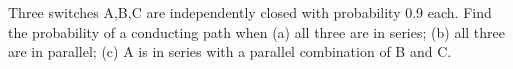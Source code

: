 Three switches A,B,C are independently closed with probability 0.9 each. Find the probability of a conducting path when (a) all three are in series; (b) all three are in parallel; (c) A is in series with a parallel combination of B and C.
